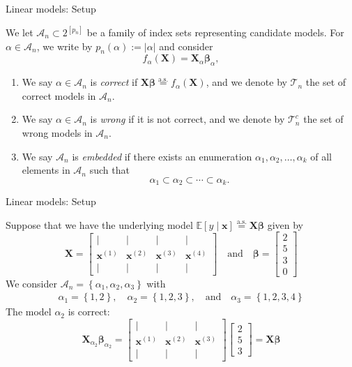 \documentclass{beamer}
\newcommand{\0}{\emptyset}
\newcommand{\Ep}[1]{\mathbb{E}\left[ #1 \right]}
\newcommand{\set}[1]{\left\{ #1 \right\}}
\newcommand{\Acal}{\mathcal{A}_{n}}
\newcommand{\Tcal}{\mathcal{T}_{n}}
\newcommand{\aseq}{\stackrel{\mathrm{a.s.}}{=}}
\newcommand{\X}{\boldsymbol{X}}
\newcommand{\x}{\boldsymbol{x}}
\newcommand{\bbeta}{\boldsymbol{\beta}}
\newcommand{\1}{\mathmybb{1}}
\begin{document}
\begin{frame}{Linear models: Setup}
    
    We let \(\Acal\subset2^{[p_{n}]}\) be a family of index sets representing candidate models. For \(\alpha\in\Acal\), we write by \(p_{n}(\alpha) := |\alpha|\) and consider
    \[f_{\alpha}(\X) = \X_{\alpha}\bbeta_{\alpha},\]

    \begin{enumerate}
        \item We say \(\alpha\in\Acal\) is \emph{correct} if \(\X\bbeta\aseq f_{\alpha}(\X)\), and we denote by \(\Tcal\) the set of correct models in \(\Acal\).
        \item We say \(\alpha\in\Acal\) is \emph{wrong} if it is not correct, and we denote by \(\Tcal^{c}\) the set of wrong models in \(\Acal\).
        \item We say \(\Acal\) is \emph{embedded} if there exists an enumeration \(\alpha_{1}, \alpha_{2}, \ldots, \alpha_{k}\) of all elements in \(\Acal\) such that \[\alpha_{1}\subset\alpha_{2}\subset\cdots\subset\alpha_{k}.\]
    \end{enumerate}

\end{frame}

\begin{frame}{Linear models: Setup}
    \begin{example}
        Suppose that we have the underlying model \(\Ep{y\mid\x} \aseq \X\bbeta\) given by
        \[\X = \begin{bmatrix}
          | & | & | & |\\
          \x^{(1)} & \x^{(2)} & \x^{(3)} & \x^{(4)} \\
          | & | & | & |
        \end{bmatrix}\quad\text{and}\quad \bbeta = \begin{bmatrix}
          2\\
          5\\
          3\\
          0
        \end{bmatrix}\]
        We consider \(\Acal = \set{\alpha_{1}, \alpha_{2}, \alpha_{3}}\) with
        \begin{align*}
            \alpha_{1} = \set{1,2},\quad\alpha_{2}=\set{1,2,3},\quad\text{and}\quad\alpha_{3} = \set{1,2,3,4}
        \end{align*}
        The model \(\alpha_{2}\) is correct:
        \[\X_{\alpha_{2}}\bbeta_{\alpha_{2}} = \begin{bmatrix}
          | & | & | \\
          \x^{(1)} & \x^{(2)} & \x^{(3)} \\
          | & | & | 
        \end{bmatrix}\begin{bmatrix}
          2\\
          5\\
          3
        \end{bmatrix} = \X\bbeta\]
      
    \end{example}

\end{frame}
\end{document}
